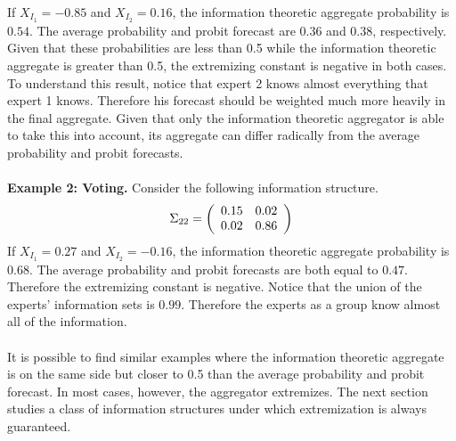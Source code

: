 \documentclass[11pt,twoside]{article}
\newtheorem{observation}[theorem]{Observation}
\begin{document}
If $X_{I_1} = -0.85$ and $X_{I_2} = 0.16$, the information theoretic aggregate probability  is $0.54$. The average probability and probit forecast are  $0.36$ and $0.38$,
respectively. Given that these probabilities are less than 0.5 while the information theoretic aggregate is greater than 0.5, the extremizing constant is negative in both cases. To understand this result, notice that expert 2 knows almost everything that expert 1 knows. Therefore his forecast should be weighted much more heavily in the final aggregate. Given that only the information theoretic aggregator is able to take this into account, its aggregate can differ radically from the average probability and probit forecasts. 
\\
\\
\textbf{Example 2: Voting.} Consider the following information structure. 
\begin{align*}
\Sigma_{22} =  \left(\begin{array}{c c}
0.15 & 0.02\\
0.02 & 0.86 \\
 \end{array}\right)
\end{align*}
 If $X_{I_1} = 0.27$ and $X_{I_2} = -0.16$, the information theoretic aggregate probability  is $0.68$. The average probability and probit forecasts are both equal to $0.47$. Therefore  the extremizing constant is negative. Notice that the union of the experts' information sets is $0.99$. Therefore the experts as a group know almost all of the information. 
\\
\\
It is possible to find similar examples where the information theoretic aggregate is on the same side but closer to 0.5 than the average probability and probit forecast. In most cases, however, the aggregator extremizes. The next section studies a class of information structures under which extremization is  always guaranteed.

\end{document}
